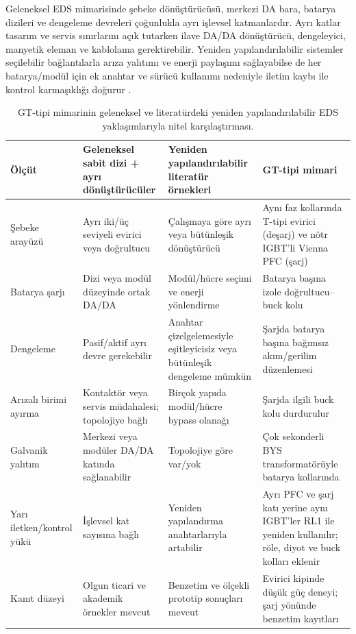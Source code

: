 Geleneksel EDS mimarisinde şebeke dönüştürücüsü, merkezi DA bara, batarya dizileri ve dengeleme devreleri çoğunlukla ayrı işlevsel katmanlardır. Ayrı katlar tasarım ve servis sınırlarını açık tutarken ilave DA/DA dönüştürücü, dengeleyici, manyetik eleman ve kablolama gerektirebilir. Yeniden yapılandırılabilir sistemler seçilebilir bağlantılarla arıza yalıtımı ve enerji paylaşımı sağlayabilse de her batarya/modül için ek anahtar ve sürücü kullanımı nedeniyle iletim kaybı ile kontrol karmaşıklığı doğurur \citep{Momayyezan2016,Farakhor2023,Huang2024}.

\begin{table}[htbp]
  \centering
  \caption{GT-tipi mimarinin geleneksel ve literatürdeki yeniden yapılandırılabilir EDS yaklaşımlarıyla nitel karşılaştırması.}
  \label{tab:gt-mimari-karsilastirma}
  \footnotesize
  \begin{tabularx}{\textwidth}{@{}p{}p{}p{}X@{}}
    \toprule
    Ölçüt & Geleneksel sabit dizi + ayrı dönüştürücüler & Yeniden yapılandırılabilir literatür örnekleri & GT-tipi mimari \\
    \midrule
    Şebeke arayüzü & Ayrı iki/üç seviyeli evirici veya doğrultucu & Çalışmaya göre ayrı veya bütünleşik dönüştürücü & Aynı faz kollarında T-tipi evirici (deşarj) ve nötr IGBT'li Vienna PFC (şarj) \\
    Batarya şarjı & Dizi veya modül düzeyinde ortak DA/DA & Modül/hücre seçimi ve enerji yönlendirme & Batarya başına izole doğrultucu--buck kolu \\
    Dengeleme & Pasif/aktif ayrı devre gerekebilir & Anahtar çizelgelemesiyle eşitleyicisiz veya bütünleşik dengeleme mümkün & Şarjda batarya başına bağımsız akım/gerilim düzenlemesi \\
    Arızalı birimi ayırma & Kontaktör veya servis müdahalesi; topolojiye bağlı & Birçok yapıda modül/hücre bypass olanağı & Şarjda ilgili buck kolu durdurulur \\
    Galvanik yalıtım & Merkezi veya modüler DA/DA katında sağlanabilir & Topolojiye göre var/yok & Çok sekonderli BYS transformatörüyle batarya kollarında \\
    Yarı iletken/kontrol yükü & İşlevsel kat sayısına bağlı & Yeniden yapılandırma anahtarlarıyla artabilir & Ayrı PFC ve şarj katı yerine aynı IGBT'ler RL1 ile yeniden kullanılır; röle, diyot ve buck kolları eklenir \\
    Kanıt düzeyi & Olgun ticari ve akademik örnekler mevcut & Benzetim ve ölçekli prototip sonuçları mevcut \citep{Momayyezan2016,Farakhor2023,Huang2024} & Evirici kipinde düşük güç deneyi; şarj yönünde benzetim kayıtları \\
    \bottomrule
  \end{tabularx}
\end{table}

